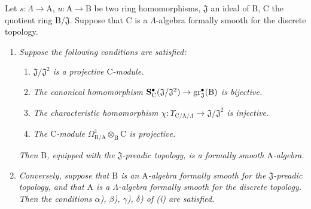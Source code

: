 \begin{theorem}[22.1.1]
\label{0.22.1.1}
Let $s:\Lambda\to\mathrm{A}$, $u:\mathrm{A}\to\mathrm{B}$ be two ring homomorphisms, $\mathfrak{J}$ an ideal of $\mathrm{B}$, $\mathrm{C}$ the quotient ring $\mathrm{B}/\mathfrak{J}$.
Suppose that $\mathrm{C}$ is a $\Lambda$-algebra formally smooth for the discrete topology.
\begin{enumerate}
  \item[\rm{(i)}] \emph{Suppose the following conditions are satisfied:}
  \begin{enumerate}
    \item[\textup{$\alpha$)}] $\mathfrak{J}/\mathfrak{J}^2$ \emph{is a projective $\mathrm{C}$-module.}
    \item[\textup{$\beta$)}] \emph{The canonical homomorphism $\mathbf{S}^\bullet_\mathrm{C}(\mathfrak{J}/\mathfrak{J}^2)\to\operatorname{gr}^\bullet_\mathfrak{J}(\mathrm{B})$  is bijective.}
    \item[\textup{$\gamma$)}] \emph{The characteristic homomorphism $\chi:\Upsilon_{\mathrm{C}/\mathrm{A}/\Lambda}\to\mathfrak{J}/\mathfrak{J}^2$  is injective.}
    \item[\textup{$\delta$)}] \emph{The $\mathrm{C}$-module $\Omega^1_{\mathrm{B}/\mathrm{A}}\otimes_\mathrm{B}\mathrm{C}$ is projective.}
  \end{enumerate}
  \emph{Then $\mathrm{B}$, equipped with the $\mathfrak{J}$-preadic topology, is a formally smooth $\mathrm{A}$-algebra.}
  \item[\rm{(ii)}] \emph{Conversely, suppose that $\mathrm{B}$ is an $\mathrm{A}$-algebra formally smooth for the $\mathfrak{J}$-preadic topology, and that $\mathrm{A}$ is a $\Lambda$-algebra formally smooth for the discrete topology.
  Then the conditions $\alpha$), $\beta$), $\gamma$), $\delta$) of \rm{(i)} are satisfied.}
\end{enumerate}
\end{theorem}

